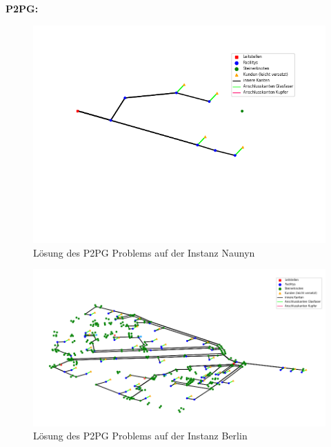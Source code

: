\documentclass[11pt,a4paper]{article}
\theoremstyle{my_th_style1}
\begin{document}
\textbf{P2PG:}
\begin{figure}[!htbp]
	\begin{center}
		\begin{minipage}{10.0cm}
			\includegraphics[width=1\textwidth]{./Bilder/P2PG_Naunyn}
			\caption{Lösung des P2PG Problems auf der Instanz Naunyn}
			\label{fig:p2pg n pic}
		\end{minipage}
	\end{center}
\end{figure}

\begin{figure}[!htbp]
\begin{center}
	\begin{minipage}{15.0cm}
		\includegraphics[width=1\textwidth]{./Bilder/P2PG_Berlin}
		\caption{Lösung des P2PG Problems auf der Instanz Berlin}
		\label{p2pg b pic}
	\end{minipage}
\end{center}
\end{figure}
\end{document}
